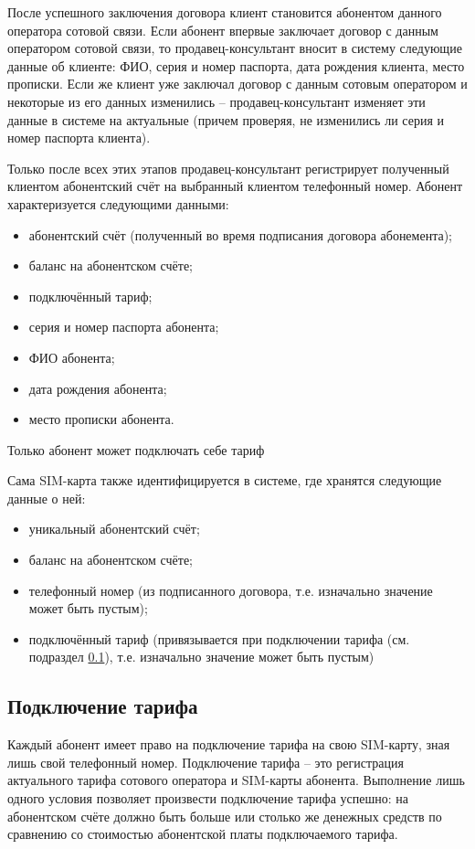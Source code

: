 После успешного заключения договора клиент становится абонентом данного оператора сотовой связи. Если абонент впервые заключает договор с данным оператором сотовой связи, то продавец-консультант вносит в систему следующие данные об клиенте: ФИО, серия и номер паспорта, дата рождения клиента, место прописки. Если же клиент уже заключал договор с данным сотовым оператором и некоторые из его данных изменились -- продавец-консультант изменяет эти данные в системе на актуальные (причем проверяя, не изменились ли серия и номер паспорта клиента).

Только после всех этих этапов продавец-консультант регистрирует полученный клиентом абонентский счёт на выбранный клиентом телефонный номер. Абонент характеризуется следующими данными:
\begin{itemize}
    \item абонентский счёт (полученный во время подписания договора абонемента);
    \item баланс на абонентском счёте;
    \item подключённый тариф;
    \item серия и номер паспорта абонента;
    \item ФИО абонента;
    \item дата рождения абонента;
    \item место прописки абонента.
\end{itemize}

Только абонент может подключать себе тариф

Сама SIM-карта также идентифицируется в системе, где хранятся следующие данные о ней:
\begin{itemize}
    \item уникальный абонентский счёт;
    \item баланс на абонентском счёте;
    \item телефонный номер (из подписанного договора, т.е. изначально значение может быть пустым);
    \item подключённый тариф (привязывается при подключении тарифа (см. подраздел \ref{subsec:tariff-connection}), т.е. изначально значение может быть пустым)
\end{itemize}


\subsection{Подключение тарифа}\label{subsec:tariff-connection}


Каждый абонент имеет право на подключение тарифа на свою SIM-карту, зная лишь свой телефонный номер. Подключение тарифа -- это регистрация актуального тарифа сотового оператора и SIM-карты абонента. Выполнение лишь одного условия позволяет произвести подключение тарифа успешно: на абонентском счёте должно быть больше или столько же денежных средств по сравнению со стоимостью абонентской платы подключаемого тарифа.

